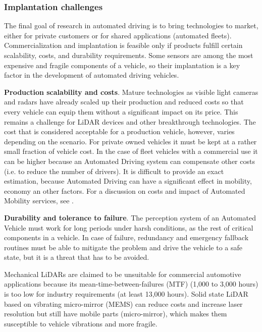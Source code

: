 

\subsubsection{Implantation challenges}

The final goal of research in automated driving is to bring technologies to
market, either for private customers or for shared applications (automated 
fleets). Commercialization and implantation is feasible only if products 
fulfill certain scalability, costs, and durability requirements. 
Some sensors are among the most expensive and fragile components of a vehicle,
so their implantation is a key factor in the development of automated driving
vehicles.

\textbf{Production scalability and costs}. 
Mature technologies as visible light cameras and radars have already scaled up 
their production and reduced costs so that every vehicle can equip them without
a significant impact on its price. This remains a challenge for LiDAR devices
and other breakthrough technologies.
The cost that is considered acceptable for a production vehicle, however, 
varies depending on the scenario. For private owned vehicles it must be kept at 
a rather small fraction of vehicle cost. In the case of fleet vehicles with a 
commercial use it can be higher because an Automated Driving system can 
compensate other costs (i.e. to reduce the number of drivers).
It is difficult to provide an exact estimation, because Automated Driving can 
have a significant effect in mobility, economy an other factors. 
For a discussion on costs and impact of Automated Mobility services, see
\cite{Bosch2018}.

\textbf{Durability and tolerance to failure}.
The perception system of an Automated Vehicle must work for long
periods under harsh conditions, as the rest of critical components in a vehicle.
In case of failure, redundancy and emergency fallback routines must be able to 
mitigate the problem and drive the vehicle to a safe state, but it is a 
threat that has to be avoided.

Mechanical LiDARs are claimed \cite{Hampstead2018} to be unsuitable for
commercial automotive applications because its mean-time-between-failures (MTF)
(1,000 to 3,000 hours) is too low for industry requirements (at least 13,000
hours).
Solid state LiDAR based on vibrating micro-mirror (MEMS) can reduce costs and 
increase laser resolution but still have mobile parts (micro-mirror), which
makes them susceptible to vehicle vibrations and more fragile.

